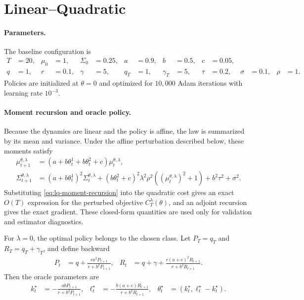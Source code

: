 \section{Linear--Quadratic}
\label{appendix:spec-lq}

\paragraph{Parameters.}
The baseline configuration is
\begin{align}
    T&=20,&
    \mu_0&=1,&
    \Sigma_0&=0.25,&
    a&=0.9,&
    b&=0.5,&
    c&=0.05,\\
    q&=1,&
    r&=0.1,&
    \gamma&=5,&
    q_T&=1,&
    \gamma_T&=5,&
    \tau&=0.2,&
    \sigma&=0.1,&
    \rho&=1.
\end{align}
Policies are initialized at $\theta=0$ and optimized for $10{,}000$ Adam iterations with learning rate $10^{-3}$.

\paragraph{Moment recursion and oracle policy.}
Because the dynamics are linear and the policy is affine, the law is summarized by its mean and variance. Under the affine perturbation described below, these moments satisfy
\begin{align}
    \mu_{t+1}^{\theta,\lambda}
    &=
    \left(a+b\theta_t^1+b\theta_t^2+c\right)\mu_t^{\theta,\lambda},
    \\
    \Sigma_{t+1}^{\theta,\lambda}
    &=
    \left(a+b\theta_t^1\right)^2\Sigma_t^{\theta,\lambda}
    +
    \left(b\theta_t^2+c\right)^2
    \lambda^2\rho^2
    \left((\mu_t^{\theta,\lambda})^2+1\right)
    +
    b^2\tau^2+\sigma^2.
    \label{eq:lq-moment-recursion}
\end{align}
Substituting \eqref{eq:lq-moment-recursion} into the quadratic cost gives an exact $O(T)$ expression for the perturbed objective $C_T^\lambda(\theta)$, and an adjoint recursion gives the exact gradient. These closed-form quantities are used only for validation and estimator diagnostics.

For $\lambda=0$, the optimal policy belongs to the chosen class. Let $P_T=q_T$ and $R_T=q_T+\gamma_T$, and define backward
\begin{align}
    P_t
    &=
    q+\frac{ra^2P_{t+1}}{r+b^2P_{t+1}},
    &
    R_t
    &=
    q+\gamma
    +
    \frac{r(a+c)^2R_{t+1}}{r+b^2R_{t+1}}.
\end{align}
Then the oracle parameters are
\begin{align}
    k_t^\star
    &=
    -\frac{abP_{t+1}}{r+b^2P_{t+1}},
    &
    \ell_t^\star
    &=
    -\frac{b(a+c)R_{t+1}}{r+b^2R_{t+1}},
    &
    \theta_t^\star
    &=
    \left(k_t^\star,\ell_t^\star-k_t^\star\right).
\end{align}

